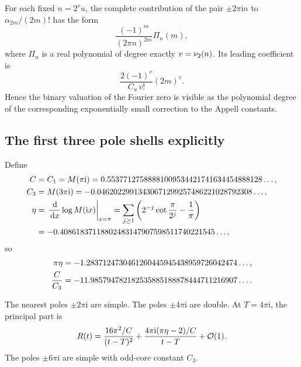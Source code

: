 \documentclass[11pt,oneside]{article}
\numberwithin{equation}{section}
\theoremstyle{definition}
\theoremstyle{remark}
\newcommand{\ii}{\mathrm i}
\newcommand{\dd}{\,\mathrm d}
\begin{document}
\begin{corollary}
\label{p2:cor:pole-degree}
For each fixed $n=2^vu$, the complete contribution of the pair $\pm2\pi\ii n$ to
$\alpha_{2m}/(2m)!$ has the form
\begin{equation}
 \frac{(-1)^m}{(2\pi n)^{2m}}\Pi_n(m),
 \label{p2:eq:Pi-shell}
\end{equation}
where $\Pi_n$ is a real polynomial of degree exactly $v=\nu_2(n)$.  Its leading coefficient is
\begin{equation}
 \frac{2(-1)^{v}}{C_u\,v!}(2m)^v.
 \label{p2:eq:Pi-leading}
\end{equation}
Hence the binary valuation of the Fourier zero is visible as the polynomial degree of the
corresponding exponentially small correction to the Appell constants.
\end{corollary}

\subsection{The first three pole shells explicitly}

Define
\begin{align}
 C&=C_1=M(\pi\ii)
 =0.55377127588881009534421741634454888128\ldots,
 \label{p2:eq:C-value}\\
 C_3&=M(3\pi\ii)
 =-0.04620229913430671299257486221028792308\ldots,
 \label{p2:eq:C3-value}\\
 \eta&=\left.\frac{\dd}{\dd x}\log M(\ii x)\right|_{x=\pi}
 =\sum_{j\ge1}\left(2^{-j}\cot\frac{\pi}{2^j}-\frac1\pi\right)
 \notag\\
 &=-0.40861837118802483147907598511740221545\ldots,
 \label{p2:eq:eta-value}
\end{align}
so
\begin{align}
 \pi\eta
 &=-1.2837124730461260445945438959726042474\ldots,\notag\\
 \frac{C}{C_3}
 &=-11.985794782182535885188878444711216907\ldots.
 \label{p2:eq:eta-ratio-values}
\end{align}

The nearest poles $\pm2\pi\ii$ are simple.  The poles $\pm4\pi\ii$ are double.  At
$T=4\pi\ii$, the principal part is
\begin{equation}
 R(t)=\frac{16\pi^2/C}{(t-T)^2}
 +\frac{4\pi\ii(\pi\eta-2)/C}{t-T}+\BigO(1).
 \label{p2:eq:double-pole-principal}
\end{equation}
The poles $\pm6\pi\ii$ are simple with odd-core constant $C_3$.
\end{document}
